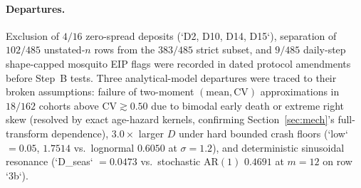 \paragraph{Departures.}
Exclusion of $4/16$ zero-spread deposits (`D2, D10, D14, D15`), separation of $102/485$ unstated-$n$ rows from the $383/485$ strict subset, and $9/485$ daily-step shape-capped mosquito EIP flags were recorded in dated protocol amendments before Step~B tests. Three analytical-model departures were traced to their broken assumptions: failure of two-moment $(\text{mean}, \mathrm{CV})$ approximations in $18/162$ cohorts above $\mathrm{CV} \gtrsim 0.50$ due to bimodal early death or extreme right skew (resolved by exact age-hazard kernels, confirming Section~\ref{sec:mech}'s full-transform dependence), $3.0\times$ larger $D$ under hard bounded crash floors (`low` $= 0.05$, $1.7514$ vs.\ lognormal $0.6050$ at $\sigma = 1.2$), and deterministic sinusoidal resonance (`D\_seas` $= 0.0473$ vs.\ stochastic $\mathrm{AR}(1)$ $0.4691$ at $m = 12$ on row `3b`).




